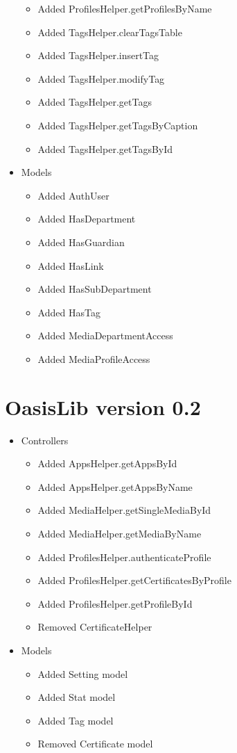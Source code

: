\begin{itemize}
\begin{itemize}
		\item Added ProfilesHelper.getProfilesByName 
		\item Added TagsHelper.clearTagsTable
		\item Added TagsHelper.insertTag
		\item Added TagsHelper.modifyTag
		\item Added TagsHelper.getTags
		\item Added TagsHelper.getTagsByCaption
		\item Added TagsHelper.getTagsById
	\end{itemize}
	\item Models
	\begin{itemize}
		\item Added AuthUser
		\item Added HasDepartment
		\item Added HasGuardian
		\item Added HasLink
		\item Added HasSubDepartment
		\item Added HasTag
		\item Added MediaDepartmentAccess
		\item Added MediaProfileAccess
	\end{itemize}
\end{itemize}

\section{OasisLib version 0.2}
\begin{itemize}
	\item Controllers
	\begin{itemize}	
		\item Added AppsHelper.getAppsById
		\item Added AppsHelper.getAppsByName
		\item Added MediaHelper.getSingleMediaById
		\item Added MediaHelper.getMediaByName
		\item Added ProfilesHelper.authenticateProfile
		\item Added ProfilesHelper.getCertificatesByProfile
		\item Added ProfilesHelper.getProfileById
		\item Removed CertificateHelper
	\end{itemize}
	\item Models
	\begin{itemize}
		\item Added Setting model
		\item Added Stat model
		\item Added Tag model
		\item Removed Certificate model
	\end{itemize}
\end{itemize}

